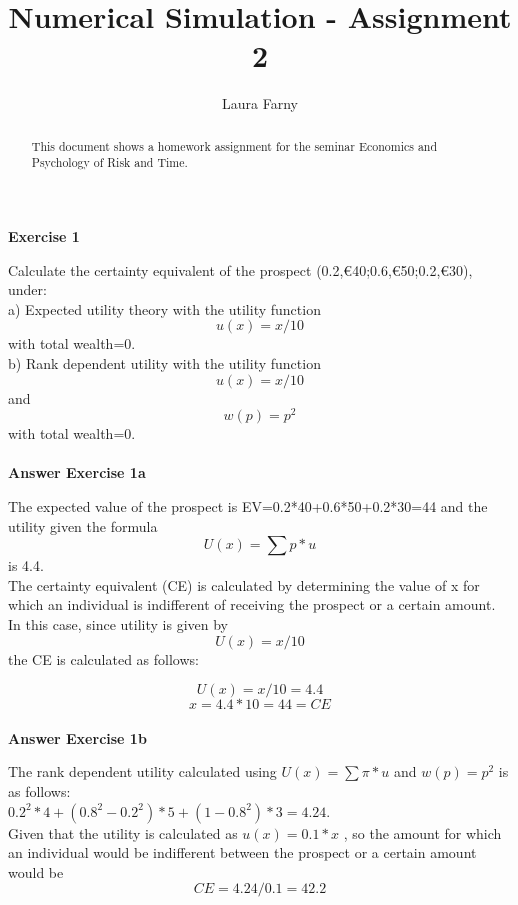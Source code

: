 \documentclass[12pt]{article}
\begin{document}
	
\title{Numerical Simulation - Assignment 2}
\author{Laura Farny}

{}


\begin{abstract}
	This document shows a homework assignment for the seminar Economics and Psychology of Risk and Time.
	
\end{abstract}

\textbf {Exercise 1\\}

Calculate the certainty equivalent of the prospect (0.2,€40;0.6,€50;0.2,€30), under: \\
a) Expected utility theory with the utility function \[u(x) =x/10\] with total wealth=0. \\
b) Rank dependent utility with the utility function \[u(x) =x/10\] and \[w(p) = p^{2}\] with total wealth=0. \\
\\


\textbf {Answer Exercise 1a\\}

The expected value of the prospect is EV=0.2*40+0.6*50+0.2*30=44 and the utility given the formula \[U(x)=\sum p*u\] is 4.4.\\
The certainty equivalent (CE) is calculated by determining the value of x for which an individual is indifferent of receiving the prospect or a certain amount. In this case, since utility is given by \[U(x)=x/10\]  the CE is calculated as follows:

\[U(x)=x/10 =4.4\]
\[x=4.4*10=44=CE\]\\


\textbf {Answer Exercise 1b\\}

The rank dependent utility calculated using \(U(x)=\sum \pi *u\) and \(w(p)=p^{2}\) is as follows: \\
\(0.2^{2}*4 + (0.8^{2}-0.2^{2})*5 + (1-0.8^{2})*3 = 4.24\). \\
Given that the utility is calculated as \(u(x)=0.1*x\) , so the amount for which an individual would be indifferent between the prospect or a certain amount would be \[CE=4.24/0.1=42.2\]\\
\\
\\
\end{document}

